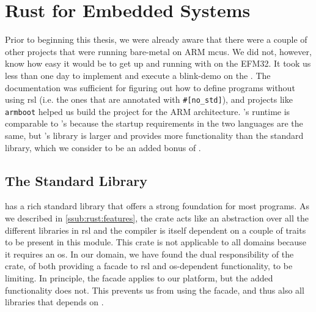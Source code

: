 
\section{Rust for Embedded Systems} %
\label{sec:disc:rust_for_arm}

Prior to beginning this thesis, we were already aware that there were a couple of other projects that were running {\rust} bare-metal on ARM \glspl{mcu}.
We did not, however, know how easy it would be to get up and running with {\rust} on the EFM32.
It took us less than one day to implement and execute a {\rust} blink-demo on the {\STK}.
The {\rust} documentation was sufficient for figuring out how to define {\rust} programs without using \gls{rsl} (i.e. the ones that are annotated with \texttt{\#[no\_std]}), and projects like \texttt{armboot} helped us build the project for the ARM architecture.
{\rust}'s runtime is comparable to {\C}'s because the startup requirements in the two languages are the same, but {\rust}'s {\core} library is larger and provides more functionality than the {\C} standard library, which we consider to be an added bonus of {\rust}.

\subsection{The Standard Library} %
\label{sub:using_the_standard_library}

{\rust} has a rich standard library that offers a strong foundation for most {\rust} programs.
As we described in \autoref{ssub:rust:features}, the {\std} crate acts like an abstraction over all the different libraries in \gls{rsl} and the {\rustc} compiler is itself dependent on a couple of traits to be present in this module.
This crate is not applicable to all domains because it requires an \gls{os}.
In our domain, we have found the dual responsibility of the {\std} crate, of both providing a facade to \gls{rsl} and \gls{os}-dependent functionality, to be limiting.
In principle, the facade applies to our platform, but the added functionality does not.
This prevents us from using the facade, and thus also all libraries that depends on {\std}.

